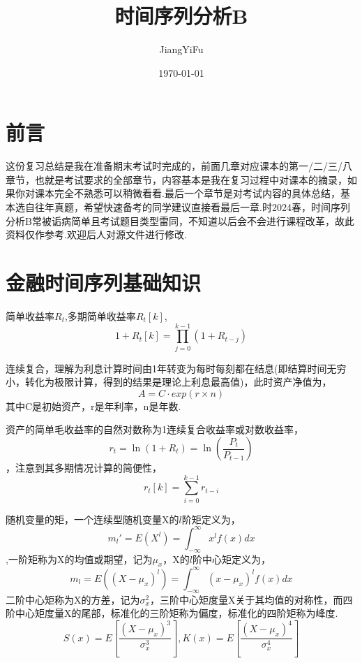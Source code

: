 \documentclass[UTF8]{ctexart}
\title{时间序列分析B}
\author{JiangYiFu}
\date{\today}
\begin{document}
    \maketitle

    \tableofcontents    
    \newpage

\section{前言}

这份复习总结是我在准备期末考试时完成的，前面几章对应课本的第一/二/三/八章节，也就是考试要求的全部章节，内容基本是我在复习过程中对课本的摘录，如果你对课本完全不熟悉可以稍微看看.最后一个章节是对考试内容的具体总结，基本选自往年真题，希望快速备考的同学建议直接看最后一章.时2024春，时间序列分析B常被诟病简单且考试题目类型雷同，不知道以后会不会进行课程改革，故此资料仅作参考.欢迎后人对源文件进行修改.

\section{金融时间序列基础知识}

简单收益率$R_t$,多期简单收益率$R_t [k]$,\[1+R_t [k]=\prod_{j=0}^{k-1}(1+R_{t-j})\]

\hspace*{\fill}

连续复合，理解为利息计算时间由1年转变为每时每刻都在结息(即结算时间无穷小，转化为极限计算，得到的结果是理论上利息最高值)，此时资产净值为，\[A=C \cdot exp(r\times n)\]其中C是初始资产，r是年利率，n是年数.

\hspace*{\fill}

资产的简单毛收益率的自然对数称为1连续复合收益率或对数收益率，\[r_t = \ln(1+R_t)=\ln(\dfrac{P_t}{P_{t-1}})\]，注意到其多期情况计算的简便性，\[r_t[k]=\sum_{i=0}^{k-1}r_{t-i}\]

\hspace*{\fill}

随机变量的矩，一个连续型随机变量X的$l$阶矩定义为，\[m_l '=E(X^{l})=\int_{-\infty}^{\infty}x^{l}f(x)dx\],一阶矩称为X的均值或期望，记为$\mu_x$，X的$l$阶中心矩定义为，\[m_l =E((X-\mu_x)^{l})=\int_{-\infty}^{\infty}(x-\mu_x)^{l}f(x)dx\]二阶中心矩称为X的方差，记为$\sigma_x^2$，三阶中心矩度量X关于其均值的对称性，而四阶中心矩度量X的尾部，标准化的三阶矩称为偏度，标准化的四阶矩称为峰度.\[S(x)=E[\dfrac{(X-\mu_x)^3}{\sigma_x^3}],K(x)=E[\dfrac{(X-\mu_x)^4}{\sigma_x^4}]\]

\hspace*{\fill}
\end{document}
